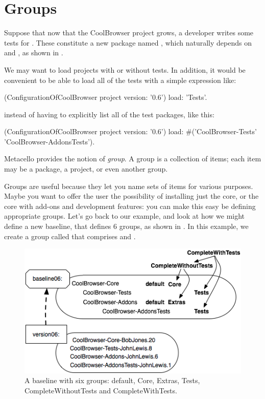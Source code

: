 \documentclass[a4paper,10pt,twoside]{book}
\begin{document}
\section{Groups}
Suppose that now that the CoolBrowser project grows, a developer writes some tests for .  These constitute a new package named , which naturally depends on  and , as shown in .

We may want to load projects with or without tests. In addition, it would be convenient to be able to load all of the tests with a simple expression like:

\begin{code}{}
(ConfigurationOfCoolBrowser project version: '0.6') load: 'Tests'.
\end{code}

instead of having to explicitly list all of the test packages, like this:
 
\begin{code}{} 
(ConfigurationOfCoolBrowser project version: '0.6') 
       load: #('CoolBrowser-Tests' 'CoolBrowser-AddonsTests').
\end{code}
 
Metacello provides the notion of \emph{group}. A group is a collection of items; each item may be a package, a project, or even another group.  
 
Groups are useful because they let you name sets of items for various purposes. Maybe you want to offer the  user the possibility of installing just the core, or the core with add-ons and development features: you can make this easy be defining appropriate groups.  Let's go back to our example, and look at how we might define a new baseline,  that defines 6 groups, as shown in . In this example, we create a group called  that comprises  and . 


\begin{figure}
\begin{center}
\includegraphics[width=0.9\linewidth]{version06}
\caption{A baseline with six groups: default, Core, Extras, Tests, CompleteWithoutTests and CompleteWithTests.\label{fig:version06}}
\end{center}
\end{figure} 
\end{document}
